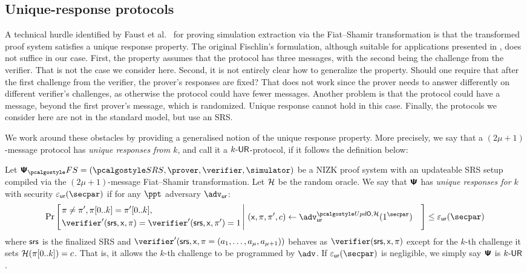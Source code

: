\subsection{Unique-response protocols}
A technical hurdle identified by Faust et al.~\cite{INDOCRYPT:FKMV12} for proving
simulation extraction via the Fiat--Shamir transformation is that the transformed
proof system satisfies a unique response property. The original Fischlin's
formulation, although suitable for applications presented in
\cite{C:Fischlin05,INDOCRYPT:FKMV12}, does not suffice in our case. First, the
property assumes that the protocol has three messages, with the second being the
challenge from the verifier. That is not the case we consider here. Second, it is not
entirely clear how to generalize the property. Should one require that after the
first challenge from the verifier, the prover's responses are fixed?  That does not
work since the prover needs to answer differently on different verifier's challenges,
as otherwise the protocol could have fewer messages.  Another problem is that the
protocol could have a message, beyond the first prover's message, which is
randomized. Unique response cannot hold in this case. Finally, the protocols we
consider here are not in the standard model, but use an SRS.

We work around these obstacles by providing a generalised notion of the unique
response property. More precisely, we say that a $(2\mu + 1)$-message protocol
has \emph{unique responses from $k$}, and call it a ${k\text{-}\mathsf{UR}}$-protocol, if it
follows the definition below:

\begin{definition}
Let $\psfs = (\SRScer, \prover, \verifier, \simulator)$ be a NIZK proof system with an updateable SRS setup compiled via the $(2\mu + 1)$-message Fiat--Shamir transformation. Let $\mathcal{H}$ be the random oracle. 
We say that $\bm{\mathsf{\Psi}}$ has \emph{unique responses for $k$} with security $\epsur(\secpar)$ if for any $\ppt$ adversary $\advur$:
  \[
	\Pr\left[
		\left.
	\begin{aligned}
	& \zkproof \neq \zkproof', \zkproof[0..k] = \zkproof'[0..k],  \\
	& \verifier' (\srs, \inp, \zkproof) =
	\verifier' (\srs, \inp, \zkproof') = 1  \\
	\end{aligned}
	\,\right|\,
	\begin{aligned}
		& (\inp, \zkproof, \zkproof', c) \gets \advur^{\initU,\ro}(1^\secpar) 
	\end{aligned}
	\right] \leq \epsur(\secpar) 
	\]
	where $\mathsf{srs}$ is the finalized SRS and $\verifier'(\srs,\inp,\zkproof=(a_1, \dots, a_\mu,a_{\mu+1}))$ behaves as $\verifier (\srs, \inp, \zkproof)$ except for the $k$-th challenge it sets $\mathcal{H}(\pi[0..k]) = c$. That is, it allows the $k$-th challenge to be programmed by $\adv$. 
	If $\epsur(\secpar)$ is negligible, we simply say $\bm{\mathsf{\Psi}}$ is ${k\text{-}\mathsf{UR}}$.
\end{definition}

